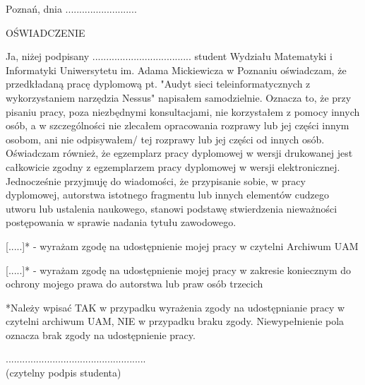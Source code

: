 


\thispagestyle{empty}

\begin{flushright}
	Poznań, dnia ..........................
\end{flushright}

\vspace{1 cm}

\begin{center}
	{\large OŚWIADCZENIE}
\end{center}

\vspace{0.75 cm}

Ja, niżej podpisany .................................... student Wydziału Matematyki i Informatyki Uniwersytetu im. Adama Mickiewicza w Poznaniu oświadczam, że przedkładaną pracę dyplomową pt. "Audyt sieci teleinformatycznych z wykorzystaniem narzędzia Nessus" napisałem samodzielnie. Oznacza to, że przy pisaniu pracy, poza niezbędnymi konsultacjami, nie korzystałem z pomocy innych osób, a w szczególności nie zlecałem opracowania rozprawy lub jej części innym osobom, ani nie odpisywałem/ tej rozprawy lub jej części od innych osób.
Oświadczam również, że egzemplarz pracy dyplomowej w wersji drukowanej jest całkowicie zgodny z egzemplarzem pracy dyplomowej w wersji elektronicznej.
Jednocześnie przyjmuję do wiadomości, że przypisanie sobie, w pracy dyplomowej, autorstwa istotnego fragmentu lub innych elementów cudzego utworu lub ustalenia naukowego, stanowi podstawę stwierdzenia nieważności postępowania w sprawie nadania tytułu zawodowego.


[.....]* - wyrażam zgodę na udostępnienie mojej pracy w czytelni Archiwum UAM

[.....]* - wyrażam zgodę na udostępnienie mojej pracy w zakresie koniecznym do ochrony mojego prawa do autorstwa lub praw osób trzecich

*Należy wpisać TAK w przypadku wyrażenia zgody na udostępnianie pracy w czytelni archiwum UAM, NIE w przypadku braku zgody. Niewypełnienie pola oznacza brak zgody na udostępnienie pracy.

\vspace{0.75 cm}

\begin{flushright}
	...................................................\\
	(czytelny podpis studenta)
\end{flushright}
